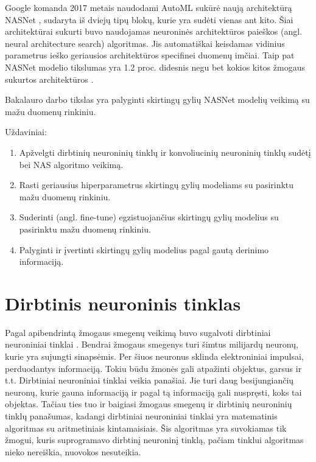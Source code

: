 \documentclass{VUMIFPSbakalaurinis}
\begin{document}
Google komanda 2017 metais naudodami AutoML sukūrė naują architektūrą NASNet \cite{DBLP:journals/corr/ZophVSL17}, sudaryta iš dviejų tipų blokų, kurie yra sudėti vienas ant kito. 
Šiai architektūrai sukurti buvo naudojamas neuroninės architektūros paieškos (angl. neural architecture search) algoritmas. Jis automatiškai keisdamas vidinius parametrus ieško geriausios architektūros specifinei duomenų imčiai.
Taip pat NASNet modelio tikslumas yra 1.2 proc. didesnis negu bet kokios kitos žmogaus sukurtos architektūros \cite{DBLP:journals/corr/ZophVSL17}.

Bakalauro darbo tikslas yra palyginti skirtingų gylių NASNet modelių veikimą su mažu duomenų rinkiniu.

Uždaviniai:
\begin{enumerate}
    \item Apžvelgti dirbtinių neuroninių tinklų ir konvoliucinių neuroninių tinklų sudėtį bei NAS algoritmo veikimą.
    \item Rasti geriausius hiperparametrus skirtingų gylių modeliams su pasirinktu mažu duomenų rinkiniu.
    \item Suderinti (angl. fine-tune) egzistuojančius skirtingų gylių modelius su pasirinktu mažu duomenų rinkiniu.
    \item Palyginti ir įvertinti skirtingų gylių modelius pagal gautą derinimo informaciją.
\end{enumerate}

\section{Dirbtinis neuroninis tinklas}
Pagal apibendrintą žmogaus smegenų veikimą buvo sugalvoti dirbtiniai neuroniniai tinklai \cite{Goodfellow-et-al-2016}. Bendrai žmogaus smegenys turi šimtus
milijardų neuronų, kurie yra sujungti sinapsėmis. Per šiuos neuronus sklinda elektroniniai impulsai, perduodantys informaciją. Tokiu būdu žmonės gali 
atpažinti objektus, garsus ir t.t. Dirbtiniai neuroniniai tinklai veikia panašiai. Jie turi daug besijungiančių neuronų, kurie gauna informaciją ir 
pagal tą informaciją gali nuspręsti, koks tai objektas. Tačiau ties tuo ir baigiasi žmogaus smegenų ir dirbtinių neuroninių tinklų panašumas, 
kadangi dirbtiniai neuroniniai tinklai yra matematinis algoritmas su aritmetiniais kintamaisiais. Šis algoritmas yra suvokiamas 
tik žmogui, kuris suprogramavo dirbtinį neuroninį tinklą, pačiam tinklui algoritmas nieko nereiškia, nuovokos nesuteikia.
\end{document}
